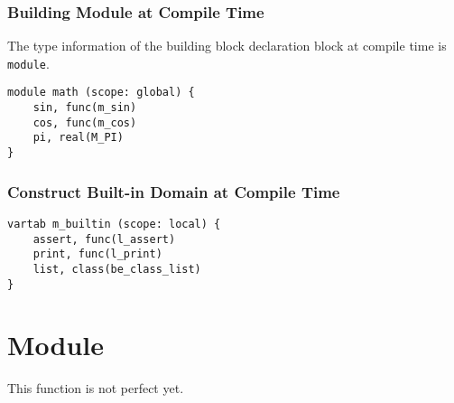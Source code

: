 \subsubsection {Building Module at Compile Time}

The type information of the building block declaration block at compile time is \texttt{module}.\begin{lstlisting}
module math (scope: global) {
    sin, func(m_sin)
    cos, func(m_cos)
    pi, real(M_PI)
}
\end{lstlisting}

\subsubsection {Construct Built-in Domain at Compile Time}

\begin{lstlisting}
vartab m_builtin (scope: local) {
    assert, func(l_assert)
    print, func(l_print)
    list, class(be_class_list)
}
\end{lstlisting}

\section {Module}

This function is not perfect yet.